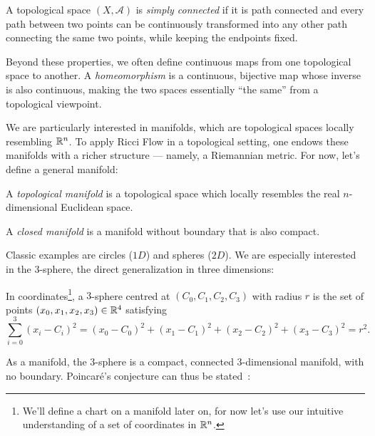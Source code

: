 \begin{definition}
    A topological space $(X,\mathcal{A})$ is \emph{simply connected} if it is path connected and every path between two points can be continuously transformed into any other path connecting the same two points, while keeping the endpoints fixed.
\end{definition}

Beyond these properties, we often define continuous maps from one topological space to another. A \emph{homeomorphism} is a continuous, bijective map whose inverse is also continuous, making the two spaces essentially “the same” from a topological viewpoint.

We are particularly interested in manifolds, which are topological spaces locally resembling $\mathbb{R}^n$. To apply Ricci Flow in a topological setting, one endows these manifolds with a richer structure — namely, a Riemannian metric. For now, let's define a general manifold:

\begin{definition}[Manifold]\label{def:manifold-prev}
    A \emph{topological manifold} is a topological space which locally resembles the real $n$-dimensional Euclidean space.
\end{definition}

\begin{definition}
    A \emph{closed manifold} is a manifold without boundary that is also compact.
\end{definition}

Classic examples are circles ($1D$) and spheres ($2D$). We are especially interested in the $3$-sphere, the direct generalization in three dimensions:

\begin{definition}[$3$-sphere]
    In coordinates\footnote{We'll define a chart on a manifold later on, for now let's use our intuitive understanding of a set of coordinates in $\mathbb{R}^n$.}, a $3$-sphere centred at $(C_0,C_1,C_2,C_3)$ with radius $r$ is the set of points $(x_0,x_1,x_2,x_3) \in \mathbb{R}^4$ satisfying
    \begin{equation}
        \sum_{i=0}^3 (x_i - C_i)^2 = (x_0 - C_0)^2 + (x_1 - C_1)^2 + (x_2 - C_2)^2 + (x_3 - C_3)^2 = r^2.
    \end{equation}
\end{definition}

As a manifold, the $3$-sphere  is a compact, connected $3$-dimensional manifold, with no boundary. Poincaré's conjecture can thus be stated~\cite{poincare:analysis-situs}:

